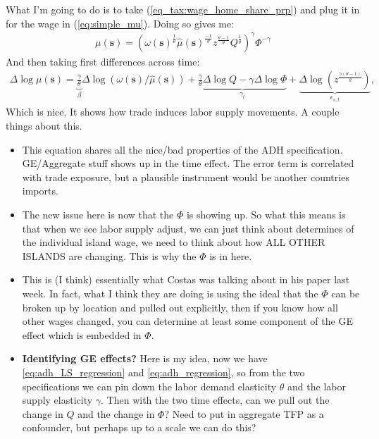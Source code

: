 \documentclass[pdftex,12pt]{article}
\begin{document}
\medskip
\noindent What I'm going to do is to take (\ref{eq_tax:wage_home_share_prp}) and plug it in for the wage in (\ref{eq:simple_mu}). Doing so gives me:
\begin{align}
\mu(\textbf{s}) = \left(\omega(\textbf{s})^{\frac{1}{\theta}} \hat \mu( \textbf{s})^{\frac{-1}{\theta}}z^{\frac{\theta-1}{\theta}} Q^{\frac{1}{\theta}} \right)^{\gamma} \Phi^{-\gamma}
\label{eq:simple_mu}
\end{align}
And then taking first differences across time:
\begin{align}
\Delta \log \mu(\textbf{s}) = \underbrace{\frac{\gamma}{\theta}}_{\beta}\Delta \log \left( \omega(\textbf{s})/\hat \mu( \textbf{s})\right) +  \underbrace{\frac{\gamma}{\theta}\Delta \log Q - \gamma \Delta \log \Phi}_{\gamma_t} + \underbrace{\Delta \log \left(z^{\frac{\gamma (\theta-1)}{\theta}}\right)}_{\epsilon_{s,t}},
\label{eq:adh_LS_regression}
\end{align}
Which is nice. It shows how trade induces labor supply movements. A couple things about this.
\begin{itemize}
\item This equation shares all the nice/bad properties of the ADH specification. GE/Aggregate stuff shows up in the time effect. The error term is correlated with trade exposure, but a plausible instrument would be another countries imports.

\item The new issue here is now that the $\Phi$ is showing up. So what this means is that when we see labor supply adjust, we can just think about determines of the individual island wage, we need to think about how ALL OTHER ISLANDS are changing. This is why the $\Phi$ is in here.

\item This is (I think) essentially what Costas was talking about in his paper last week. In fact, what I think they are doing is using the ideal that the $\Phi$ can be broken up by location and pulled out explicitly, then if you know how all other wages changed, you can determine at least some component of the GE effect which is embedded in $\Phi$.

\item \textbf{Identifying GE effects?} Here is my idea, now we have \ref{eq:adh_LS_regression} and \ref{eq:adh_regression}, so from the two specifications we can pin down the labor demand elasticity $\theta$ and the labor supply elasticity $\gamma$. Then with the two time effects, can we pull out the change in $Q$ and the change in $\Phi$? Need to put in aggregate TFP as a confounder, but perhaps up to a scale we can do this?
\end{itemize}
\end{document}
